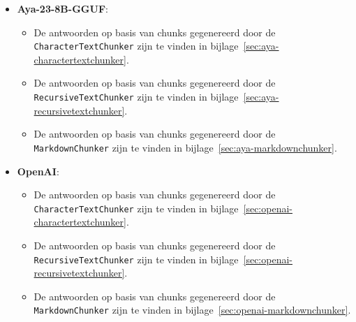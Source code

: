 \begin{itemize}
    \item \textbf{Aya-23-8B-GGUF}:
    \begin{itemize}
        \item De antwoorden op basis van chunks gegenereerd door de \texttt{CharacterTextChunker} zijn te vinden in bijlage~\ref{sec:aya-charactertextchunker}.
        \item De antwoorden op basis van chunks gegenereerd door de \texttt{RecursiveTextChunker} zijn te vinden in bijlage~\ref{sec:aya-recursivetextchunker}.
        \item De antwoorden op basis van chunks gegenereerd door de \texttt{MarkdownChunker} zijn te vinden in bijlage~\ref{sec:aya-markdownchunker}.
    \end{itemize}
    \item \textbf{OpenAI}:
    \begin{itemize}
        \item De antwoorden op basis van chunks gegenereerd door de \texttt{CharacterTextChunker} zijn te vinden in bijlage~\ref{sec:openai-charactertextchunker}.
        \item De antwoorden op basis van chunks gegenereerd door de \texttt{RecursiveTextChunker} zijn te vinden in bijlage~\ref{sec:openai-recursivetextchunker}.
        \item De antwoorden op basis van chunks gegenereerd door de \texttt{MarkdownChunker} zijn te vinden in bijlage~\ref{sec:openai-markdownchunker}.           
    \end{itemize}
\end{itemize}

\subsection{}%
\label{subsec:eigenlijke-evaluatie}

\subsubsection{}%

